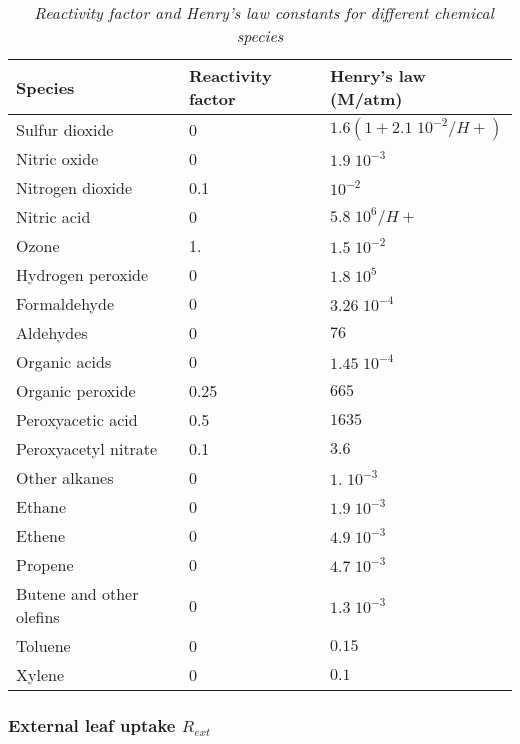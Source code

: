 \begin{table}
\begin{center}
\begin{tabular}{lll} \hline
Species         & Reactivity factor     & Henry's law (M/atm) \\ \hline 
Sulfur dioxide  & 0     & $1.6(1+2.1\; 10^{-2}/H+)$ \\
Nitric oxide    & 0     & $1.9\; 10^{-3}$        \\
Nitrogen dioxide & 0.1  & $10^{-2}$              \\
Nitric acid      & 0    & $5.8\; 10^{6}/H+$       \\
Ozone           & 1.    & $1.5\; 10^{-2}$         \\
Hydrogen peroxide  & 0  & $1.8\; 10^{5}$          \\
Formaldehyde    & 0     & $3.26\; 10^{-4}$ \\
Aldehydes       & 0     & $76$ \\
Organic acids   & 0     & $1.45\; 10^{-4}$ \\
Organic peroxide  & 0.25& $665$ \\
Peroxyacetic acid  & 0.5& $1635$ \\
Peroxyacetyl nitrate &0.1& $3.6$ \\
Other alkanes & 0       & $1.\; 10^{-3}$ \\
Ethane           & 0    & $1.9\; 10^{-3}$ \\
Ethene           & 0    & $4.9\; 10^{-3}$ \\
Propene           & 0   & $4.7\; 10^{-3}$ \\
Butene and other olefins  & 0   & $1.3\; 10^{-3}$ \\
Toluene       & 0       & $0.15$ \\
Xylene      & 0         & $0.1$ \\ 
\hline
\end{tabular}
\caption{\sl ~{Reactivity factor and Henry's law constants for different chemical species}}
\label{const}

\end{center}
\end{table}

\subsubsection{External leaf uptake $R_{ext}$}

